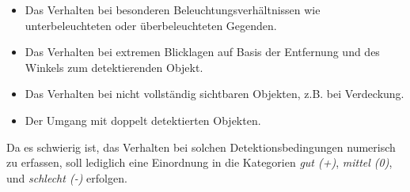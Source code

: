 \begin{itemize}
	\item Das Verhalten bei besonderen Beleuchtungsverhältnissen wie unterbeleuchteten oder überbeleuchteten Gegenden.
	\item Das Verhalten bei extremen Blicklagen auf Basis der Entfernung und des Winkels zum detektierenden Objekt.
	\item Das Verhalten bei nicht vollständig sichtbaren Objekten, z.B. bei Verdeckung.
	\item Der Umgang mit doppelt detektierten Objekten. 
\end{itemize}

Da es schwierig ist, das Verhalten bei solchen Detektionsbedingungen numerisch zu erfassen, soll lediglich eine Einordnung in die Kategorien \textit{gut (+)}, \textit{mittel (0)}, und \textit{schlecht (-)} erfolgen.
